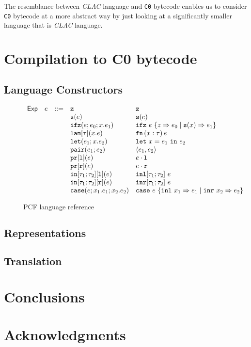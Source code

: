 \documentclass{acm_proc_article-sp}
\newcommand{\ccb}{\texttt{C0} bytecode }
\newcommand{\clac}{{\em CLAC} language }
\newcommand{\claci}{{\em CLAC} language}
\begin{document}
The resemblance between \clac and \ccb enables us to consider \ccb at a more abstract way by just looking at a significantly smaller language that is \claci.

\section{Compilation to {\secit C0} bytecode}

\subsection{Language Constructors}
\begin{figure}
\[
\begin{array}{r c c l l}
\ms{Exp} & e     & ::= &\zero                     & \zero\\
        &        &    & \suc(e)                   & \suc(e)\\
        &        &    & \ifz(e;e_0;x.e_1)         & \ifz ~e~ \{z \goesto e_0 \mid \suc(x) \goesto e_1\}\\
        &        &    & \lam[\tau](x.e)           & \irl{fn}\,(x : \tau)\,e\\
        &        &    & \letexp{x}{e_1}{e_2}      & \letbind{x}{e_1}{e_2} \\
        &        &    & \irl{pair}(e_1;e_2) & \pair{e_1}{e_2}\\
        &        &    & \irl{pr[l]}(e)        & e \cdot \irl{l}\\
        &        &    & \irl{pr[r]}(e)        & e \cdot \irl{r}\\
        &        &    & \inlt(e)        & \irl{inl}[\tau_1; \tau_2] ~e\\
        &        &    & \inrt(e)        & \irl{inr}[\tau_1; \tau_2] ~e\\
        &        &    & \ecase(e; x_1.e_1; x_2.e_2)  & \ecase~e~\{\irl{inl}~x_1 \goesto e_1 \mid \irl{inr}~x_2 \goesto e_2\}
\end{array}
\]
\caption{PCF language reference}
\end{figure}
\subsection{Representations}
\subsection{Translation}

\section{Conclusions}

\section{Acknowledgments}


\end{document}
